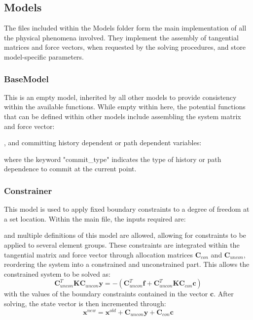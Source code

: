\documentclass[3p]{elsarticle} %
\begin{document}
\subsection{Models}
The files included within the Models folder form the main implementation of all the physical phenomena involved. They implement the assembly of tangential matrices and force vectors, when requested by the solving procedures, and store model-specific parameters. 

\subsubsection{BaseModel}
This is an empty model, inherited by all other models to provide consistency within the available functions. While empty within here, the potential functions that can be defined within other models include assembling the system matrix and force vector:

, and committing history dependent or path dependent variables:

where the keyword "commit{\_}type" indicates the type of history or path dependence to commit at the current point. 

\subsubsection{Constrainer}
This model is used to apply fixed boundary constraints to a degree of freedom at a set location. Within the main file, the inputs required are:

and multiple definitions of this model are allowed, allowing for constraints to be applied to several element groups. These constraints are integrated within the tangential matrix and force vector through  allocation matrices $\bm{C}_{con}$ and $\bm{C}_{uncon}$, reordering the system into a constrained and unconstrained part. This allows the constrained system to be solved as:
\begin{equation}
	\bm{C}_{uncon}^T \bm{K} \bm{C}_{uncon} \mathbf{y} = -\left(\bm{C}_{uncon}^T\bm{f}+\bm{C}_{uncon}^T \bm{K} \bm{C}_{con}\mathbf{c}\right)
\end{equation}
with the values of the boundary constraints contained in the vector $\mathbf{c}$. After solving, the state vector is then incremented through:
\begin{equation}
	\mathbf{x}^{new} = \mathbf{x}^{old} + \bm{C}_{uncon}\mathbf{y} + \bm{C}_{con}\mathbf{c}
\end{equation}
\end{document}
